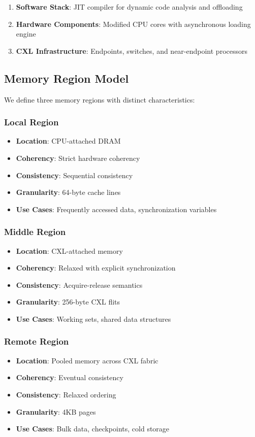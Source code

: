 \documentclass[10pt,conference]{IEEEtran}
\begin{document}
\begin{enumerate}
    \item \textbf{Software Stack}: JIT compiler for dynamic code analysis and offloading
    \item \textbf{Hardware Components}: Modified CPU cores with asynchronous loading engine
    \item \textbf{CXL Infrastructure}: Endpoints, switches, and near-endpoint processors
\end{enumerate}

\subsection{Memory Region Model}

We define three memory regions with distinct characteristics:

\subsubsection{Local Region}
\begin{itemize}
    \item \textbf{Location}: CPU-attached DRAM
    \item \textbf{Coherency}: Strict hardware coherency
    \item \textbf{Consistency}: Sequential consistency
    \item \textbf{Granularity}: 64-byte cache lines
    \item \textbf{Use Cases}: Frequently accessed data, synchronization variables
\end{itemize}

\subsubsection{Middle Region}
\begin{itemize}
    \item \textbf{Location}: CXL-attached memory
    \item \textbf{Coherency}: Relaxed with explicit synchronization
    \item \textbf{Consistency}: Acquire-release semantics
    \item \textbf{Granularity}: 256-byte CXL flits
    \item \textbf{Use Cases}: Working sets, shared data structures
\end{itemize}

\subsubsection{Remote Region}
\begin{itemize}
    \item \textbf{Location}: Pooled memory across CXL fabric
    \item \textbf{Coherency}: Eventual consistency
    \item \textbf{Consistency}: Relaxed ordering
    \item \textbf{Granularity}: 4KB pages
    \item \textbf{Use Cases}: Bulk data, checkpoints, cold storage
\end{itemize}
\end{document}

